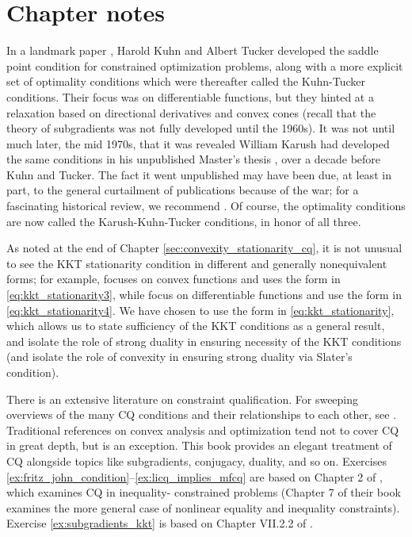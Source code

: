 \SkipTocEntry\section*{Chapter notes}

In a landmark paper \cite{kuhn1951nonlinear}, Harold Kuhn and Albert Tucker
developed the saddle point condition for constrained optimization problems,
along with a more explicit set of optimality conditions which were thereafter
called the Kuhn-Tucker conditions. Their focus was on differentiable functions,
but they hinted at a relaxation based on directional derivatives and
convex cones (recall that the theory of subgradients was not fully developed
until the 1960s). It was not until much later, the mid 1970s, that it was
revealed  William Karush had developed the same conditions in his unpublished
Master's thesis \cite{karush1939minima}, over a decade before Kuhn and 
Tucker. The fact it went unpublished may have been due, at least in part, to the  
general curtailment of publications because of the war; for a fascinating
historical review, we  recommend \cite{kuhn1976nonlinear,
  kjeldsen2000contextualized, cottle2012william}. Of course, the optimality
conditions are now called the Karush-Kuhn-Tucker conditions, in honor of all
three.     

As noted at the end of Chapter \ref{sec:convexity_stationarity_cq}, it is not
unusual to see the KKT stationarity condition in different and generally
nonequivalent forms; for example, \cite{rockafellar1970convex} focuses on convex
functions and uses the form in \eqref{eq:kkt_stationarity3}, while
\cite{boyd2004convex} focus on differentiable functions and use the form in 
\eqref{eq:kkt_stationarity4}. We have chosen to use the form 
in \eqref{eq:kkt_stationarity}, which allows us to state sufficiency of the KKT 
conditions as a general result, and isolate the role of strong duality in 
ensuring necessity of the KKT conditions (and isolate the role of convexity in
ensuring strong duality via Slater's condition). 

There is an extensive literature on constraint qualification. For sweeping
overviews of the many CQ conditions and their relationships to each other, 
see \cite{peterson1973review, giorgi2018guided}. Traditional references on
convex analysis and optimization tend not to cover CQ in great depth, but   
\cite{borwein2006convex} is an exception. This book provides an elegant
treatment of CQ alongside topics like subgradients, conjugacy, duality, and so
on. Exercises \ref{ex:fritz_john_condition}--\ref{ex:licq_implies_mfcq} are
based on Chapter 2 of \cite{borwein2006convex}, which examines CQ in inequality-
constrained problems (Chapter 7 of their book examines the more general case of 
nonlinear equality and inequality constraints). Exercise
\ref{ex:subgradients_kkt} is based on Chapter VII.2.2 of 
\cite{hiriartUrruty1993convex}. 

